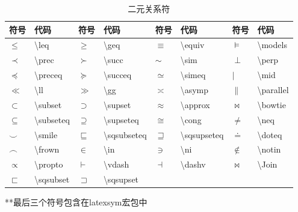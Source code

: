 \documentclass[UTF8,fontset=ubuntu]{ctexbook}
\begin{document}
\begin{table}[H]
\begin{tabular}{l l l l l l l l}
    \hline
    符号 & 代码 & 符号 & 代码 & 符号 & 代码 & 符号 & 代码\\\hline
    $\leq$ & \textbackslash leq & $\geq$ & \textbackslash geq & $\equiv$ & \textbackslash equiv & $\models$ & \textbackslash models\\
    $\prec$ & \textbackslash prec & $\succ$ & \textbackslash succ & $\sim$ & \textbackslash sim & $\perp$ & \textbackslash perp\\
    $\preceq$ & \textbackslash preceq & $\succeq$ & \textbackslash succeq & $\simeq$ & \textbackslash simeq & $\mid$ & \textbackslash mid\\
    $\ll$ & \textbackslash ll & $\gg$ & \textbackslash gg & $\asymp$ & \textbackslash asymp & $\parallel$ & \textbackslash parallel\\
    $\subset$ & \textbackslash subset & $\supset$ & \textbackslash supset & $\approx$ & \textbackslash approx & $\bowtie$ & \textbackslash bowtie\\
    $\subseteq$ & \textbackslash subseteq & $\supseteq$ & \textbackslash supseteq & $\cong$ & \textbackslash cong & $\neq$ & \textbackslash neq\\
    $\smile$ & \textbackslash smile & $\sqsubseteq$ & \textbackslash sqsubseteq & $\sqsupseteq$ & \textbackslash sqsupseteq & $\doteq$ & \textbackslash doteq\\
    $\frown$ & \textbackslash frown & $\in$ & \textbackslash in & $\ni$ & \textbackslash ni & $\notin$ & \textbackslash notin\\
    $\propto$ & \textbackslash propto & $\vdash$ & \textbackslash vdash & $\dashv$ & \textbackslash dashv & $\Join$ & \textbackslash Join\\
    $\sqsubset$ & \textbackslash sqsubset & $\sqsupset$ & \textbackslash sqsupset\\
    \hline
\end{tabular}
**最后三个符号包含在latexsym宏包中
\caption{二元关系符}
\end{table}
\end{document}
